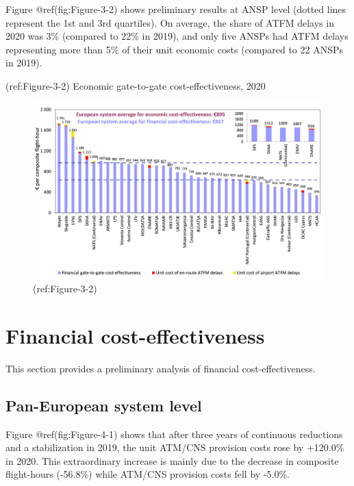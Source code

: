 \documentclass[
]{book}
\begin{document}
Figure @ref(fig:Figure-3-2) shows preliminary results at ANSP level
(dotted lines represent the 1st and 3rd quartiles). On average, the
share of ATFM delays in 2020 was 3\% (compared to 22\% in 2019), and
only five ANSPs had ATFM delays representing more than 5\% of their unit
economic costs (compared to 22 ANSPs in 2019).

(ref:Figure-3-2) Economic gate-to-gate cost-effectiveness, 2020

\begin{figure}

{\centering \includegraphics[width=1\linewidth]{figures/Figure-3-2} 

}

\caption{(ref:Figure-3-2)}\label{fig:Figure-3-2}
\end{figure}

\hypertarget{financial}{%
\chapter{Financial cost-effectiveness}\label{financial}}

This section provides a preliminary analysis of financial
cost-effectiveness.

\hypertarget{fin_1}{%
\section{Pan-European system level}\label{fin_1}}

Figure @ref(fig:Figure-4-1) shows that after three years of continuous
reductions and a stabilization in 2019, the unit ATM/CNS provision costs
rose by +120.0\% in 2020. This extraordinary increase is mainly due to
the decrease in composite flight-hours (-56.8\%) while ATM/CNS provision
costs fell by -5.0\%.
\end{document}
